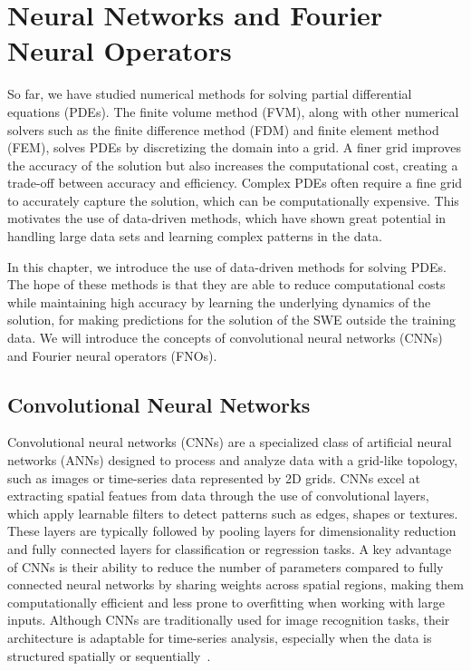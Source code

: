 \chapter{Neural Networks and Fourier Neural Operators}\label{ch:FNO+NN}
So far, we have studied numerical methods for solving partial differential equations (PDEs).
The finite volume method (FVM), along with other numerical solvers such as the finite difference method (FDM) and finite element method (FEM), solves PDEs by discretizing the domain into a grid.
A finer grid improves the accuracy of the solution but also increases the computational cost, creating a trade-off between accuracy and efficiency.
Complex PDEs often require a fine grid to accurately capture the solution, which can be computationally expensive.
This motivates the use of data-driven methods, which have shown great potential in handling large data sets and learning complex patterns in the data.

In this chapter, we introduce the use of data-driven methods for solving PDEs.
The hope of these methods is that they are able to reduce computational costs while maintaining high accuracy by learning the underlying dynamics of the solution, for making predictions for the solution of the SWE outside the training data.
We will introduce the concepts of convolutional neural networks (CNNs) and Fourier neural operators (FNOs).

\section{Convolutional Neural Networks}
Convolutional neural networks (CNNs) are a specialized class of artificial neural networks (ANNs) designed to process and analyze data with a grid-like topology, such as images or time-series data represented by 2D grids.
CNNs excel at extracting spatial featues from data through the use of convolutional layers, which apply learnable filters to detect patterns such as edges, shapes or textures.
These layers are typically followed by pooling layers for dimensionality reduction and fully connected layers for classification or regression tasks.
A key advantage of CNNs is their ability to reduce the number of parameters compared to fully connected neural networks by sharing weights across spatial regions, making them computationally efficient and less prone to overfitting when working with large inputs.
Although CNNs are traditionally used for image recognition tasks, their architecture is adaptable for time-series analysis, especially when the data is structured spatially or sequentially~\cite{chollet2017comprehensive}.

